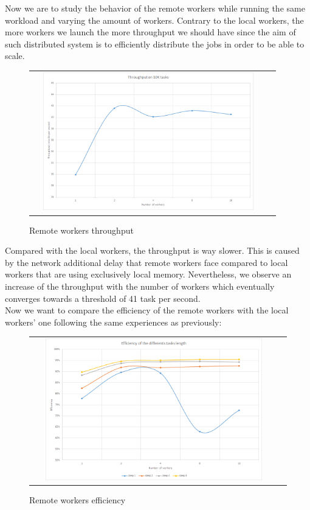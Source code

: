 \documentclass{article}
\begin{document}
Now we are to study the behavior of the remote workers while running the same workload and varying the amount of workers. Contrary to the local workers, the more workers we launch the more throughput we should have since the aim of such distributed system is to efficiently distribute the jobs in order to be able to scale.

\begin{figure}[H]
\centering
\begin{tabular}{cc}
\includegraphics[width=10cm, height=6cm]{throughput_remote_workers.png}
\end{tabular}
\caption{Remote workers throughput}
\end{figure}

Compared with the local workers, the throughput is way slower. This is caused by the network additional delay that remote workers face compared to local workers that are using exclusively local memory. Nevertheless, we observe an increase of the throughput with the number of workers which eventually converges towards a threshold of 41 task per second.\\

Now we want to compare the efficiency of the remote workers with the local workers' one following the same experiences as previously:
\begin{figure}[H]
\centering
\begin{tabular}{cc}
\includegraphics[width=0.9\textwidth]{efficiency_remote_workers.png}
\end{tabular}
\caption{Remote workers efficiency}
\end{figure}
\end{document}
